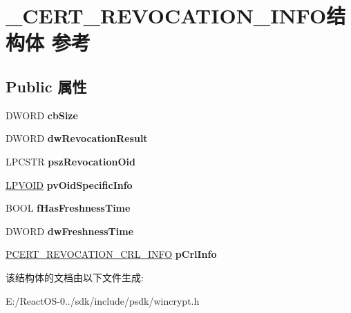 \hypertarget{struct___c_e_r_t___r_e_v_o_c_a_t_i_o_n___i_n_f_o}{}\section{\+\_\+\+C\+E\+R\+T\+\_\+\+R\+E\+V\+O\+C\+A\+T\+I\+O\+N\+\_\+\+I\+N\+F\+O结构体 参考}
\label{struct___c_e_r_t___r_e_v_o_c_a_t_i_o_n___i_n_f_o}
\subsection*{Public 属性}
\begin{DoxyCompactItemize}
\item 
\mbox{\label{struct___c_e_r_t___r_e_v_o_c_a_t_i_o_n___i_n_f_o_af54bf310c709947db71e88f6ed639f8b}} 
D\+W\+O\+RD {\bfseries cb\+Size}
\item 
\mbox{\label{struct___c_e_r_t___r_e_v_o_c_a_t_i_o_n___i_n_f_o_ac279b63a794a788cbb1834251848a1ad}} 
D\+W\+O\+RD {\bfseries dw\+Revocation\+Result}
\item 
\mbox{\label{struct___c_e_r_t___r_e_v_o_c_a_t_i_o_n___i_n_f_o_ab4aa1ab64f8318c2dd4e6d5282716928}} 
L\+P\+C\+S\+TR {\bfseries psz\+Revocation\+Oid}
\item 
\mbox{\label{struct___c_e_r_t___r_e_v_o_c_a_t_i_o_n___i_n_f_o_aaf61fee870aeb8f8a2a3d36604bcb217}} 
\hyperlink{interfacevoid}{L\+P\+V\+O\+ID} {\bfseries pv\+Oid\+Specific\+Info}
\item 
\mbox{\label{struct___c_e_r_t___r_e_v_o_c_a_t_i_o_n___i_n_f_o_aed2fa65ed277c5ecf887d0c773d83578}} 
B\+O\+OL {\bfseries f\+Has\+Freshness\+Time}
\item 
\mbox{\label{struct___c_e_r_t___r_e_v_o_c_a_t_i_o_n___i_n_f_o_a4ec2a1ba04dc446790e0570d168934fc}} 
D\+W\+O\+RD {\bfseries dw\+Freshness\+Time}
\item 
\mbox{\label{struct___c_e_r_t___r_e_v_o_c_a_t_i_o_n___i_n_f_o_a904afc65cb7d9b24871f2a9562006d97}} 
\hyperlink{struct___c_e_r_t___r_e_v_o_c_a_t_i_o_n___c_r_l___i_n_f_o}{P\+C\+E\+R\+T\+\_\+\+R\+E\+V\+O\+C\+A\+T\+I\+O\+N\+\_\+\+C\+R\+L\+\_\+\+I\+N\+FO} {\bfseries p\+Crl\+Info}
\end{DoxyCompactItemize}


该结构体的文档由以下文件生成\+:\begin{DoxyCompactItemize}
\item 
E\+:/\+React\+O\+S-\/0../sdk/include/psdk/wincrypt.\+h\end{DoxyCompactItemize}
